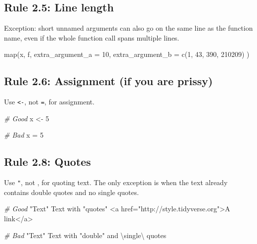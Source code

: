 \documentclass[
  letterpaper,
  DIV=11,
  numbers=noendperiod]{scrreprt}
\newenvironment{Shaded}{}{}
\newcommand{\AttributeTok}[1]{\textcolor[rgb]{0.49,0.56,0.16}{#1}}
\newcommand{\CommentTok}[1]{\textcolor[rgb]{0.38,0.63,0.69}{\textit{#1}}}
\newcommand{\DecValTok}[1]{\textcolor[rgb]{0.25,0.63,0.44}{#1}}
\newcommand{\FunctionTok}[1]{\textcolor[rgb]{0.02,0.16,0.49}{#1}}
\newcommand{\NormalTok}[1]{#1}
\newcommand{\OtherTok}[1]{\textcolor[rgb]{0.00,0.44,0.13}{#1}}
\newcommand{\SpecialCharTok}[1]{\textcolor[rgb]{0.25,0.44,0.63}{#1}}
\newcommand{\StringTok}[1]{\textcolor[rgb]{0.25,0.44,0.63}{#1}}
\begin{document}
\subsection{Rule 2.5: Line length}\label{rule-2.5-line-length}

Exception: short unnamed arguments can also go on the same line as the
function name, even if the whole function call spans multiple lines.

\begin{Shaded}
\begin{Highlighting}[]
\FunctionTok{map}\NormalTok{(x, f,}
  \AttributeTok{extra\_argument\_a =} \DecValTok{10}\NormalTok{,}
  \AttributeTok{extra\_argument\_b =} \FunctionTok{c}\NormalTok{(}\DecValTok{1}\NormalTok{, }\DecValTok{43}\NormalTok{, }\DecValTok{390}\NormalTok{, }\DecValTok{210209}\NormalTok{)}
\NormalTok{)}
\end{Highlighting}
\end{Shaded}

\subsection{Rule 2.6: Assignment (if you are
prissy)}\label{rule-2.6-assignment-if-you-are-prissy}

Use \texttt{\textless{}-}, not \texttt{=}, for assignment.

\begin{Shaded}
\begin{Highlighting}[]
\CommentTok{\# Good}
\NormalTok{x }\OtherTok{\textless{}{-}} \DecValTok{5}

\CommentTok{\# Bad}
\NormalTok{x }\OtherTok{=} \DecValTok{5}
\end{Highlighting}
\end{Shaded}

\subsection{Rule 2.8: Quotes}\label{rule-2.8-quotes}

Use \texttt{"}, not \texttt{\textquotesingle{}}, for quoting text. The
only exception is when the text already contains double quotes and no
single quotes.

\begin{Shaded}
\begin{Highlighting}[]
\CommentTok{\# Good}
\StringTok{"Text"}
\StringTok{\textquotesingle{}Text with "quotes"\textquotesingle{}}
\StringTok{\textquotesingle{}\textless{}a href="http://style.tidyverse.org"\textgreater{}A link\textless{}/a\textgreater{}\textquotesingle{}}

\CommentTok{\# Bad}
\StringTok{"Text"}
\StringTok{\textquotesingle{}Text with "double" and }\SpecialCharTok{\textbackslash{}\textquotesingle{}}\StringTok{single}\SpecialCharTok{\textbackslash{}\textquotesingle{}}\StringTok{ quotes\textquotesingle{}}
\end{Highlighting}
\end{Shaded}
\end{document}
